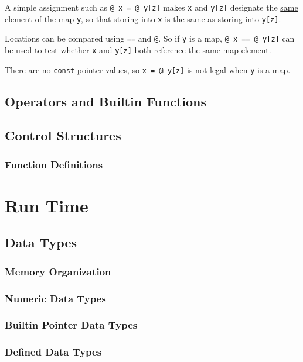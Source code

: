\documentclass[12pt]{article}
\begin{document}
A simple assignment such as {\tt @ x = @ y[z]} makes {\tt x} and
{\tt y[z]} designate the \underline{same} element of the map {\tt y},
so that storing into {\tt x} is the same as storing into
{\tt y[z]}.

Locations can be compared using {\tt ==} and {\tt @}.  So if {\tt y}
is a map, {\tt @ x == @ y[z]} can be used to test whether {\tt x}
and {\tt y[z]} both reference the same map element.

There are no {\tt const} pointer values, so {\tt x = @ y[z]} is not
legal when {\tt y} is a map.

\subsection{Operators and Builtin Functions}

\subsection{Control Structures}

\subsubsection{Function Definitions}

\section{Run Time}

\subsection{Data Types}

\subsubsection{Memory Organization}

\subsubsection{Numeric Data Types}

\subsubsection{Builtin Pointer Data Types}

\subsubsection{Defined Data Types}
\end{document}
